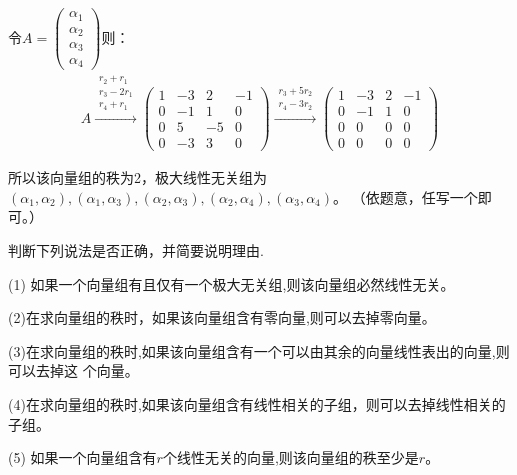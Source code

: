 \documentclass[a4paper]{report}
\begin{document}
\begin{jie}
令$A=
\begin{pmatrix}
\alpha_1\\ \alpha_2\\ \alpha_3\\ \alpha_4
\end{pmatrix}
$则：
\begin{align*}
A\xrightarrow{\substack{r_{2}+r_1 \\ r_3-2r_1\\ r_4+r_1}}{
\begin{pmatrix}
1&-3&2&-1\\ 0&-1&1&0\\ 0&5&-5&0\\ 0&-3&3&0
\end{pmatrix}
}\xrightarrow{\substack{r_{3}+5r_2 \\ r_4-3r_2}}{
\begin{pmatrix}
1&-3&2&-1\\ 0&-1&1&0\\ 0&0&0&0\\ 0&0&0&0
\end{pmatrix}
}
\end{align*}

所以该向量组的秩为2，极大线性无关组为
$(\alpha_1,\alpha_2),(\alpha_1,\alpha_3),(\alpha_2,\alpha_3),(\alpha_2,\alpha_4),(\alpha_3,\alpha_4)$。 （依题意，任写一个即可。）
\end{jie}

\EX 判断下列说法是否正确，并简要说明理由.

(1) 如果一个向量组有且仅有一个极大无关组,则该向量组必然线性无关。

(2)在求向量组的秩时，如果该向量组含有零向量,则可以去掉零向量。

(3)在求向量组的秩时,如果该向量组含有一个可以由其余的向量线性表出的向量,则可以去掉这
个向量。

(4)在求向量组的秩时,如果该向量组含有线性相关的子组，则可以去掉线性相关的子组。

(5) 如果一个向量组含有$r$个线性无关的向量,则该向量组的秩至少是$r$。
\end{document}
